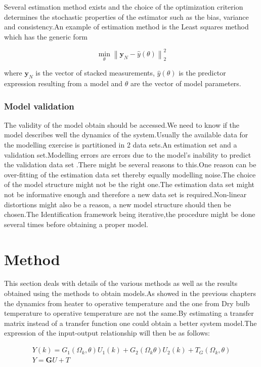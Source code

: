 \documentclass[a4paper,12pt]{article}
\numberwithin{equation}{section}
\begin{document}
Several estimation method exists and the choice of the optimization criterion determines the stochastic properties of the estimator such as the bias, variance and consistency.An example of estimation method is the Least squares method which has the generic form

\[\min _{\theta}\left\|\mathbf{y}_{N}-\hat{y}(\theta)\right\|_{2}^{2}\]

\noindent
where $\mathbf{y}_{N}$ is the vector of stacked measurements, $\hat{y}(\theta)$ is the predictor expression resulting from a model and $\theta$ are the vector of model parameters.

\subsubsection{Model validation}
The validity of the model obtain should be accessed.We need to know if the model describes well the dynamics of the system.Usually the available data for the modelling exercise is partitioned in 2 data sets.An estimation set and a validation set.Modelling errors are errors due to the model's inability  to predict the  validation data set .There might be several reasons to this.One reason can be over-fitting of the estimation data set thereby equally modelling noise.The choice of the model structure might not be the right one.The estimation data set might not be informative enough and therefore a new data set is required.Non-linear distortions might also be a reason, a new model structure should then be chosen.The Identification framework being iterative,the procedure might be done several times before obtaining a proper model. 

\newpage
\section{Method}
This section deals with details of the various methods as well as the results obtained using the methods to obtain models.As showed in the previous chapters the dynamics from heater to operative temperature and the one from Dry bulb temperature to operative temperature are not the same.By estimating  a transfer matrix instead of a transfer function one could obtain a better system model.The expression of the input-output relationship will then be as follows:

\begin{gather}
Y(k)=G_{1}\left(\Omega_{k}, \theta\right) U_{1}(k)+G_{2}\left(\Omega_{k}\theta\right) U_{2}(k)+T_{G}\left(\Omega_{k}, \theta\right) \label{eq:matrix form}\\
Y=\mathbf{G}U + T \label{eq:matrix form2}
\end{gather}
\end{document}

